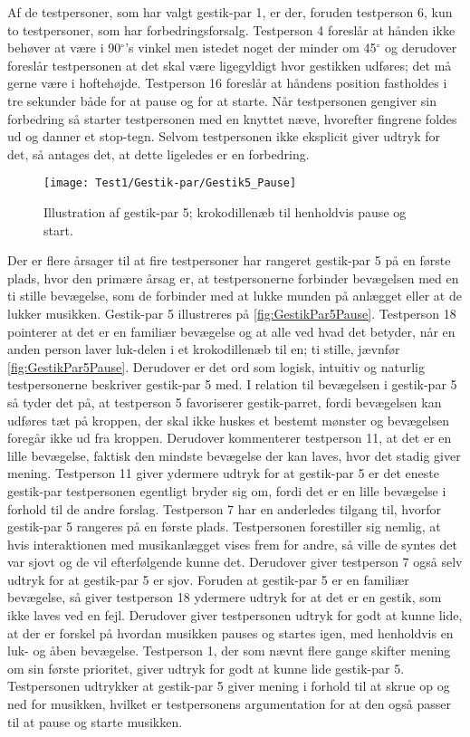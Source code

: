 Af de testpersoner, som har valgt gestik-par 1, er der, foruden testperson 6, kun to testpersoner, som har forbedringsforsalg. Testperson 4 foreslår at hånden ikke behøver at være i 90$^{\circ}$'s vinkel men istedet noget der minder om 45$^{\circ}$ og derudover foreslår testpersonen at det skal være ligegyldigt hvor gestikken udføres; det må gerne være i hoftehøjde. Testperson 16 foreslår at håndens position fastholdes i tre sekunder både for at pause og for at starte. Når testpersonen gengiver sin forbedring så starter testpersonen med en knyttet næve, hvorefter fingrene foldes ud og danner et stop-tegn. Selvom testpersonen ikke eksplicit giver udtryk for det, så antages det, at dette ligeledes er en forbedring.
%
\begin{figure}[H]
	\centering
	\texttt{[image: Test1/Gestik-par/Gestik5\_Pause]}
	\caption{Illustration af gestik-par 5; krokodillenæb til henholdvis pause og start.}
	\label{fig:GestikPar5Pause}
\end{figure}
\noindent
%
Der er flere årsager til at fire testpersoner har rangeret gestik-par 5 på en første plads, hvor den primære årsag er, at testpersonerne forbinder bevægelsen med en ti stille bevægelse, som de forbinder med at lukke munden på anlægget eller at de lukker musikken. Gestik-par 5 illustreres på \autoref{fig:GestikPar5Pause}. Testperson 18 pointerer at det er en familiær bevægelse og at alle ved hvad det betyder, når en anden person laver luk-delen i et krokodillenæb til en; ti stille, jævnfør \autoref{fig:GestikPar5Pause}. Derudover er det ord som logisk, intuitiv og naturlig testpersonerne beskriver gestik-par 5 med. I relation til bevægelsen i gestik-par 5 så tyder det på, at testperson 5 favoriserer gestik-parret, fordi bevægelsen kan udføres tæt på kroppen, der skal ikke huskes et bestemt mønster og bevægelsen foregår ikke ud fra kroppen. Derudover kommenterer testperson 11, at det er en lille bevægelse, faktisk den mindste bevægelse der kan laves, hvor det stadig giver mening. Testperson 11 giver ydermere udtryk for at gestik-par 5 er det eneste gestik-par testpersonen egentligt bryder sig om, fordi det er en lille bevægelse i forhold til de andre forslag. Testperson 7 har en anderledes tilgang til, hvorfor gestik-par 5 rangeres på en første plads. Testpersonen forestiller sig nemlig, at hvis interaktionen med musikanlægget vises frem for andre, så ville de syntes det var sjovt og de vil efterfølgende kunne det. Derudover giver testperson 7 også selv udtryk for at gestik-par 5 er sjov. Foruden at gestik-par 5 er en familiær bevægelse, så giver testperson 18 ydermere udtryk for at det er en gestik, som ikke laves ved en fejl. Derudover giver testpersonen udtryk for godt at kunne lide, at der er forskel på hvordan musikken pauses og startes igen, med henholdvis en luk- og åben bevægelse. Testperson 1, der som nævnt flere gange skifter mening om sin første prioritet, giver udtryk for godt at kunne lide gestik-par 5. Testpersonen udtrykker at gestik-par 5 giver mening i forhold til at skrue op og ned for musikken, hvilket er testpersonens argumentation for at den også passer til at pause og starte musikken.

